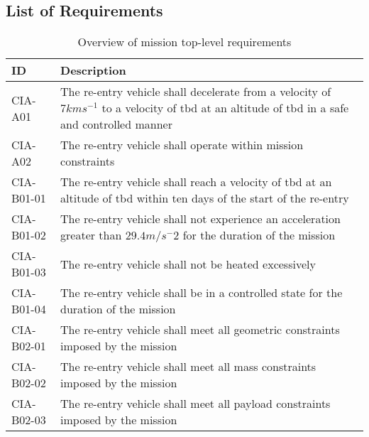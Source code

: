 \subsection{List of Requirements} \label{sec:list}

\begin{table}[H]
	\caption{Overview of mission top-level requirements}
	\begin{tabular}{|p{}|p{}|}
    \hline
    ID          & Description                                                                                                      \\ \hline \hline
    CIA-A01 & The re-entry vehicle shall decelerate from a velocity of $7 kms^{-1}$ to a velocity of \gls{tbd} at an altitude of \gls{tbd} in a safe and controlled manner \\ \hline
    CIA-A02 & The re-entry vehicle shall operate within mission constraints                                               \\ \hline
    CIA-B01-01 & The re-entry vehicle shall reach a velocity of \gls{tbd} at an altitude of \gls{tbd} within ten days of the start of the re-entry    \\ \hline
    CIA-B01-02 & The re-entry vehicle shall not experience an acceleration greater than $29.4 m/s^-2	$ for the duration of the mission			\\ \hline
    CIA-B01-03 & The re-entry vehicle shall not be heated excessively  \\ \hline
    CIA-B01-04 & The re-entry vehicle shall be in a controlled state for the duration of the mission                            \\ \hline
    CIA-B02-01 & The re-entry vehicle shall meet all geometric constraints imposed by the mission                           \\ \hline
    CIA-B02-02 & The re-entry vehicle shall meet all mass constraints imposed by the mission                                      \\ \hline
		CIA-B02-03 & The re-entry vehicle shall meet all payload constraints imposed by the mission                                      \\ \hline
    
    \end{tabular}
    \label{tab:toplevelreq}
\end{table}

